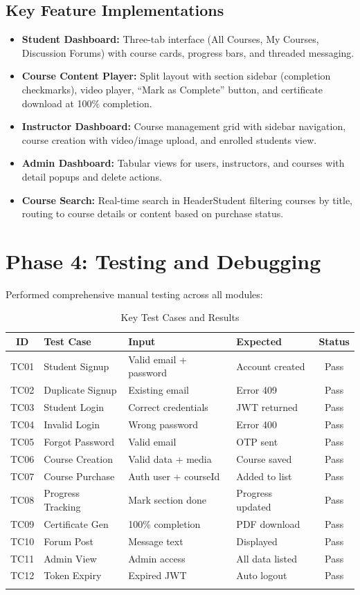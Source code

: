 \documentclass[12pt,a4paper]{report}
\begin{document}
\subsection{Key Feature Implementations}
\begin{itemize}
    \item \textbf{Student Dashboard:} Three-tab interface (All Courses, My Courses, Discussion Forums) with course cards, progress bars, and threaded messaging.
    \item \textbf{Course Content Player:} Split layout with section sidebar (completion checkmarks), video player, ``Mark as Complete'' button, and certificate download at 100\% completion.
    \item \textbf{Instructor Dashboard:} Course management grid with sidebar navigation, course creation with video/image upload, and enrolled students view.
    \item \textbf{Admin Dashboard:} Tabular views for users, instructors, and courses with detail popups and delete actions.
    \item \textbf{Course Search:} Real-time search in HeaderStudent filtering courses by title, routing to course details or content based on purchase status.
\end{itemize}

\section{Phase 4: Testing and Debugging}
Performed comprehensive manual testing across all modules:

\begin{longtable}{@{}|c|p{2.8cm}|p{3cm}|p{2.5cm}|c|@{}}
\hline
\textbf{ID} & \textbf{Test Case} & \textbf{Input} & \textbf{Expected} & \textbf{Status} \\ \hline
\endhead
TC01 & Student Signup & Valid email + password & Account created & Pass \\ \hline
TC02 & Duplicate Signup & Existing email & Error 409 & Pass \\ \hline
TC03 & Student Login & Correct credentials & JWT returned & Pass \\ \hline
TC04 & Invalid Login & Wrong password & Error 400 & Pass \\ \hline
TC05 & Forgot Password & Valid email & OTP sent & Pass \\ \hline
TC06 & Course Creation & Valid data + media & Course saved & Pass \\ \hline
TC07 & Course Purchase & Auth user + courseId & Added to list & Pass \\ \hline
TC08 & Progress Tracking & Mark section done & Progress updated & Pass \\ \hline
TC09 & Certificate Gen & 100\% completion & PDF download & Pass \\ \hline
TC10 & Forum Post & Message text & Displayed & Pass \\ \hline
TC11 & Admin View & Admin access & All data listed & Pass \\ \hline
TC12 & Token Expiry & Expired JWT & Auto logout & Pass \\ \hline
\caption{Key Test Cases and Results}
\end{longtable}
\end{document}
